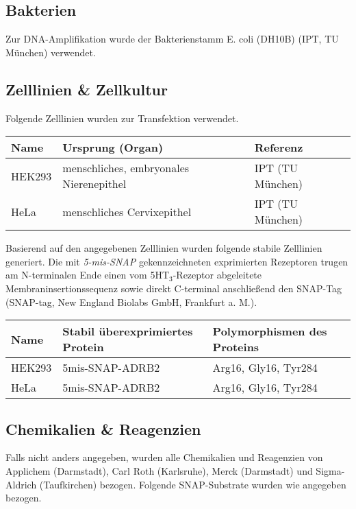 \subsection{Bakterien}
Zur DNA-Amplifikation wurde der Bakterienstamm E. coli (DH10B) (IPT, TU München) verwendet.

\subsection{Zelllinien \& Zellkultur}
Folgende Zelllinien wurden zur Transfektion verwendet.

\begin{table}[htsp]
	\begin{tabular}{lll}
\toprule
Name		&	Ursprung (Organ)				&	Referenz\\
\midrule
HEK293		&	menschliches, embryonales Nierenepithel		&	IPT (TU München)\\
HeLa		&	menschliches Cervixepithel					&	IPT (TU München)\\
\bottomrule
\end {tabular}
\end{table}

Basierend auf den angegebenen Zelllinien wurden folgende stabile Zelllinien generiert. Die mit \textit{5-mis-SNAP} gekennzeichneten exprimierten Rezeptoren trugen am N-terminalen Ende einen vom 5HT$_3$-Rezeptor abgeleitete Membraninsertionssequenz sowie direkt C-terminal anschließend den SNAP-Tag (SNAP-tag, New England Biolabs GmbH, Frankfurt a. M.). 

\begin{table}[htsb]
\begin{tabularx}{\textwidth}{lll}
\toprule
Name		&	Stabil überexprimiertes Protein	&	Polymorphismen des Proteins\\
\midrule
HEK293		&	5mis-SNAP-ADRB2		&	Arg16, Gly16, Tyr284\\
HeLa		&	5mis-SNAP-ADRB2		&	Arg16, Gly16, Tyr284\\
\bottomrule
\end{tabularx}
\end{table}

\subsection{Chemikalien \& Reagenzien}
Falls nicht anders angegeben, wurden alle Chemikalien und Reagenzien von Applichem (Darmstadt), Carl Roth (Karlsruhe), Merck (Darmstadt) und Sigma-Aldrich (Taufkirchen) bezogen. Folgende SNAP-Substrate wurden wie angegeben bezogen.

